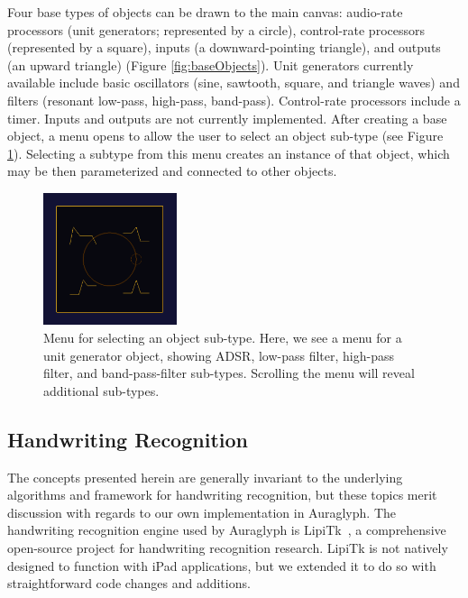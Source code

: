 \documentclass[10pt,letterpaper]{article}
\begin{document}
Four base types of objects can be drawn to the main canvas: audio-rate processors (unit generators; represented by a circle), control-rate processors (represented by a square), inputs (a downward-pointing triangle), and outputs (an upward triangle) (Figure \ref{fig:baseObjects}). 
Unit generators currently available include basic oscillators (sine, sawtooth, square, and triangle waves) and filters (resonant low-pass, high-pass, band-pass). 
Control-rate processors include a timer. 
Inputs and outputs are not currently implemented. 
After creating a base object, a menu opens to allow the user to select an object sub-type (see Figure \ref{fig:objectMenu}). Selecting a subtype from this menu creates an instance of that object, which may be then parameterized and connected to other objects. 

\begin{figure}[h]
	\centering
		\includegraphics[width=0.35\textwidth]{figures/menu.png}
	\caption{Menu for selecting an object sub-type. Here, we see a menu for a unit generator object, showing ADSR, low-pass filter, high-pass filter, and band-pass-filter sub-types. Scrolling the menu will reveal additional sub-types.}
	\label{fig:objectMenu}
\end{figure}

\subsection{Handwriting Recognition}
\label{sec:HandwritingRecognition}

The concepts presented herein are generally invariant to the underlying algorithms and framework for handwriting recognition, but these topics merit discussion with regards to our own implementation in Auraglyph. 
The handwriting recognition engine used by Auraglyph is LipiTk~\cite{madhvanath2007lipitk}, a comprehensive open-source project for handwriting recognition research. 
LipiTk is not natively designed to function with iPad applications, but we extended it to do so with straightforward code changes and additions. 
\end{document}
